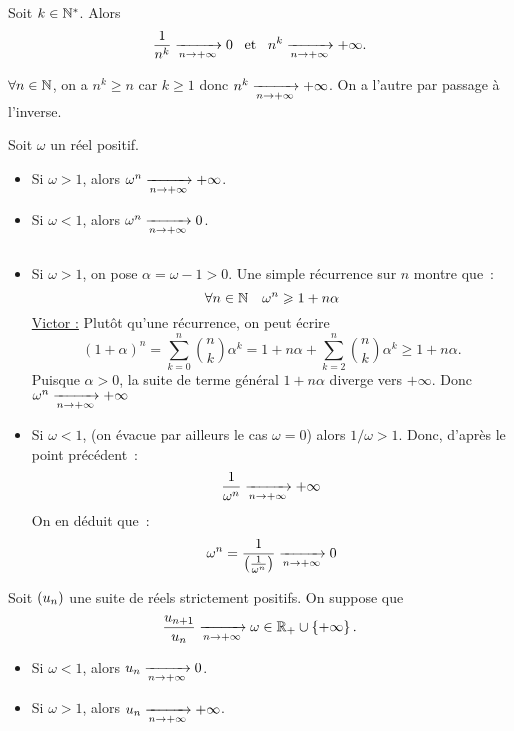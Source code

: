 \documentclass{magnolia}
\begin{document}
\begin{proposition}[utile=-3]
Soit $k\in{\mathbb{N}^*}$. Alors
\[\frac{1}{n^k} \xrightarrow[n\rightarrow +\infty]{} 0 \quad\!\text{et}\quad\!
  n^k \xrightarrow[n\rightarrow +\infty]{} +\infty.\]
\end{proposition}

\begin{preuve}
$\forall n\in \mathbb{N}$, on a $n^k\geq n$ car $k\geq 1$ donc $n^k\xrightarrow[n\rightarrow +\infty]{}+\infty$. On a l'autre par passage à l'inverse.
\end{preuve}

\begin{proposition}[utile=-3]
Soit $\omega$ un réel positif.
\begin{itemize}
\item Si $\omega>1$, alors $\omega^n\xrightarrow[n\rightarrow +\infty]{} +\infty$.
\item Si $\omega<1$, alors $\omega^n\xrightarrow[n\rightarrow +\infty]{} 0$.
\end{itemize}
\end{proposition}

\begin{preuve}
$\quad$
\begin{itemize}
\item Si $\omega>1$, on pose $\alpha=\omega-1>0$. Une simple récurrence
  sur $n$ montre que~:
  \[\forall n\in\mathbb{N} \quad  \omega^n \geqslant 1+n\alpha\]
  \underline{Victor :} Plutôt qu'une récurrence, on peut écrire $$(1+\alpha)^n=\sum_{k=0}^n\binom{n}{k}\alpha^k=1+n\alpha+\sum_{k=2}^n\binom{n}{k}\alpha^k \geq 1+n\alpha.$$
  Puisque $\alpha>0$, la suite de terme général $1+n\alpha$ diverge
  vers $+\infty$. Donc $\omega^n \xrightarrow[n\rightarrow +\infty]{} +\infty$
\item Si $\omega<1$, (on évacue par ailleurs le cas $\omega=0$) alors $1/\omega>1$. Donc, d'après le point précédent~:
  \[\frac{1}{\omega^n} \xrightarrow[n\rightarrow +\infty]{} +\infty\]
  On en déduit que~:
  \[\omega^n=\frac{1}{\left(\frac{1}{\omega^n}\right)} \xrightarrow[n\rightarrow +\infty]{} 0\]
\end{itemize}
\end{preuve}


\begin{proposition}[utile=-3]
Soit $\left(u_n\right)$ une suite de réels strictement positifs. On suppose que
\[\frac{u_{n+1}}{u_n}\xrightarrow[n\rightarrow +\infty]{}\omega\in\mathbb{R}_+\cup\left\{+\infty\right\}.\]
\begin{itemize}
\item Si $\omega<1$, alors $u_n\xrightarrow[n\rightarrow +\infty]{} 0$.
\item Si $\omega>1$, alors $u_n\xrightarrow[n\rightarrow +\infty]{} +\infty$.
\end{itemize}
\end{proposition}
\end{document}
